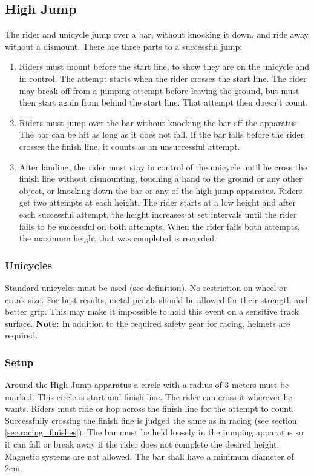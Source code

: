 \subsection{High Jump}
The rider and unicycle jump over a bar, without knocking it down, and ride away without a dismount.
There are three parts to a successful jump: 
\begin{enumerate}
\item Riders must mount before the start line, to show they are on the unicycle and in control.
The attempt starts when the rider crosses the start line.
The rider may break off from a jumping attempt before leaving the ground, but must then start again from behind the start line.
That attempt then doesn’t count.
\item Riders must jump over the bar without knocking the bar off the apparatus.
The bar can be hit as long as it does not fall.
If the bar falls before the rider crosses the finish line, it counts as an unsuccessful attempt.
\item After landing, the rider must stay in control of the unicycle until he cross the finish line without dismounting, touching a hand to the ground or any other object, or knocking down the bar or any of the high jump apparatus.
Riders get two attempts at each height.
The rider starts at a low height and after each successful attempt, the height increases at set intervals until the rider fails to be successful on both attempts.
When the rider fails both attempts, the maximum height that was completed is recorded.
\end{enumerate}

\subsubsection{Unicycles}
Standard unicycles must be used (see definition).
No restriction on wheel or crank size.
For best results, metal pedals should be allowed for their strength and better grip.
This may make it impossible to hold this event on a sensitive track surface.
\textbf{Note:} In addition to the required safety gear for racing, helmets are required.

\subsubsection{Setup}
Around the High Jump apparatus a circle with a radius of 3 meters must be marked.
This circle is start and finish line.
The rider can cross it wherever he wants.
Riders must ride or hop across the finish line for the attempt to count.
Successfully crossing the finish line is judged the same as in racing (see section \ref{sec:racing_finishes}).
The bar must be held loosely in the jumping apparatus so it can fall or break away if the rider does not complete the desired height.
Magnetic systems are not allowed.
The bar shall have a minimum diameter of 2cm.

